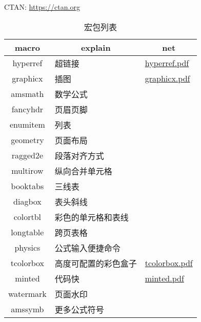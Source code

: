 \documentclass[a4paper]{ctexart}    %
\begin{document}
CTAN: \url{https://ctan.org}

\begin{table}[htpb]
    \centering
    \caption{宏包列表}
    \begin{tabular}{|c|p{6cm}|l|}
    \hline
    \textbf{macro} & \multicolumn{1}{c|}{\textbf{explain}} & \multicolumn{1}{c|}{\textbf{net}} \\\hline
    \hline
    hyperref & 超链接 & \href{../hyperref/hyperref.pdf}{hyperref.pdf}  \\\hline
    graphicx & 插图 & \href{../graphicx/graphicx.pdf}{graphicx.pdf} \\\hline
    amsmath & 数学公式 & \\\hline
    fancyhdr & 页眉页脚 & \\\hline
    enumitem & 列表 & \\\hline
    geometry & 页面布局 & \\\hline
    ragged2e & 段落对齐方式 & \\\hline
    multirow & 纵向合并单元格 & \\\hline
    booktabs & 三线表 & \\\hline
    diagbox & 表头斜线 & \\\hline
    colortbl & 彩色的单元格和表线 & \\\hline
    longtable & 跨页表格 & \\\hline
    physics & 公式输入便捷命令 & \\\hline
    tcolorbox & 高度可配置的彩色盒子 & \href{../tcolorbox/tcolorbox.pdf}{tcolorbox.pdf}\\\hline
    minted & 代码快 & \href{../minted/minted.pdf}{minted.pdf}\\\hline
    watermark & 页面水印 & \\\hline
    amssymb & 更多公式符号 & \\\hline
    \hline
    \end{tabular}
\end{table}
\end{document}
